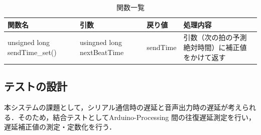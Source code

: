 \begin{table}[H]
  \centering
  \caption{関数一覧}
  \label{functions}
  \begin{tabularx}{\textwidth}{|p{4cm}|X|p{2cm}|X|}
    \hline
    関数名 & 引数 & 戻り値 & 処理内容 \\ \hline \hline
    unsigned long sendTime\_set() & usingned long nextBeatTime & sendTime & 引数（次の拍の予測絶対時間）に補正値をかけて返す \\ \hline

  \end{tabularx}  
\end{table}





\subsection{テストの設計}
本システムの課題として，シリアル通信時の遅延と音声出力時の遅延が考えられる．そのため，結合テストとしてArduino-Processing 間の往復遅延測定を行い，遅延補正値の測定・定数化を行う．

